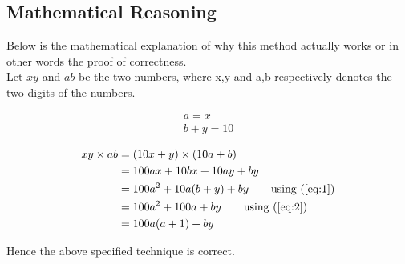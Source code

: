 \documentclass[]{article}
\begin{document}
\subsection{Mathematical Reasoning}
Below is the mathematical explanation of why this method actually works or in other words the proof of correctness.\\
Let $xy$ and $ab$ be the two numbers, where x,y and a,b respectively denotes the two digits of the numbers.

\begin{align}
a = x \label{eq:1}\\
b + y =10 \label{eq:2}
\end{align}

\begin{align*}
xy \times ab&=(10x+y) \times (10a+b) \\
&= 100ax + 10bx + 10ay + by\\
&= 100a^2 + 10a(b+y) + by \tag*{using (\ref{eq:1})}\\
&= 100a^2 + 100a + by \tag*{using (\ref{eq:2})}\\
&= 100a(a + 1) + by
\end{align*}

Hence the above specified technique is correct.
\end{document}
